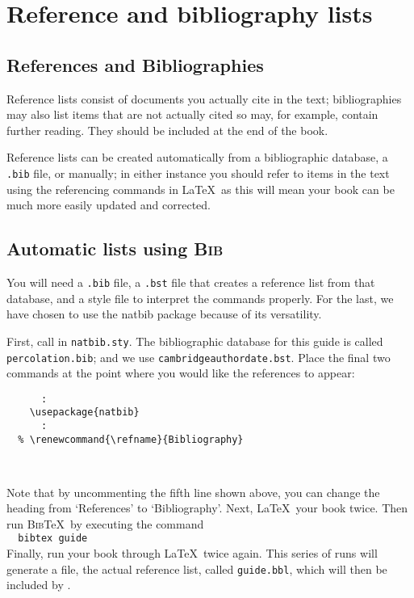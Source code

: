 
\chapter{Reference and bibliography lists}
\label{ref}

\section{References and Bibliographies}
Reference lists consist of documents you actually cite in the text; bibliographies
may also list items that are not actually cited so may, for example, contain further reading.
They should be included at the end of the book.

Reference lists can
be created automatically from a bibliographic database, a \verb".bib" file, or manually; in either instance
you should refer to items in the text using the referencing commands in \LaTeX\
as this will mean your book can be much more easily updated and corrected.

\section{Automatic lists using \textsc{Bib}\upshape{\TeX}}
You will need a \verb".bib" file, a \verb".bst" file that creates a reference
list from that database, and a style file to interpret the commands properly.
For the last, we have chosen to use the natbib package because of its versatility.

First, call in \texttt{natbib.sty}. The bibliographic database for this
guide is called \texttt{percolation.bib};
and we use \texttt{cambridgeauthordate.bst}.
Place the final two commands at the point where you would like the references to appear:
%
\begin{verbatim}
      :
    \usepackage{natbib}
      :
  % \renewcommand{\refname}{Bibliography}
    
    
\end{verbatim}
%
Note that by uncommenting the fifth line shown above, you can
change the heading from `References' to `Bibliography'.
Next, \LaTeX\ your book twice. Then run \textsc{Bib}\TeX\ by
executing the command\\[0.5\baselineskip]
\verb"  bibtex "\texttt{\cambridge guide}\\[0.5\baselineskip]
Finally, run your book through \LaTeX\ twice again.
This series of runs will generate a file, the actual reference list,
called \texttt{\cambridge guide.bbl},
which will then be included by \verb"".

